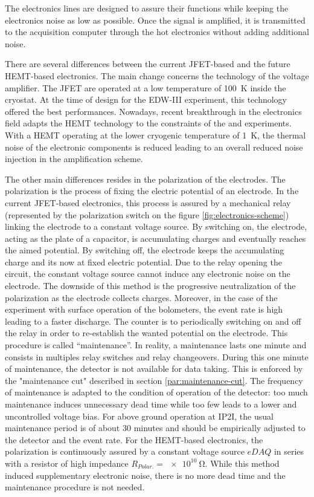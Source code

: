 The electronics lines are designed to assure their functions while keeping the electronics noise as low as possible. Once the signal is amplified, it is transmitted to the acquisition computer through the hot electronics without adding additional noise.

There are several differences between the current JFET-based and the future HEMT-based electronics.
The main change concerns the technology of the voltage amplifier. The JFET are operated at a low temperature of \SI{100}{\kelvin} inside the cryostat. At the time of design for the EDW-III experiment, this technology offered the best performances. Nowadays, recent breakthrough in the electronics field adapts the HEMT technology to the constraints of the \Edelweiss{} and \Ricochet{} experiments. With a HEMT operating at the lower cryogenic temperature of \SI{1}{\kelvin}, the thermal noise of the electronic components is reduced leading to an overall reduced noise injection in the amplification scheme.

The other main differences resides in the polarization of the electrodes. The polarization is the process of fixing the electric potential of an electrode.
In the current JFET-based electronics, this process is assured by a mechanical relay (represented by the polarization switch on the figure \ref{fig:electronics-scheme}) linking the electrode to a constant voltage source. By switching on, the electrode, acting as the plate of a capacitor, is accumulating charges and eventually reaches the aimed potential. By switching off, the electrode keeps the accumulating charge and its now at fixed electric potential. Due to the relay opening the circuit, the constant voltage source cannot induce any electronic noise on the electrode.
The downside of this method is the progressive neutralization of the polarization as the electrode collects charges. Moreover, in the case of the \Ricochet{} experiment with surface operation of the bolometers, the event rate is high leading to a faster discharge.
The counter is to periodically switching on and off the relay in order to re-establish the wanted potential on the electrode. This procedure is called “maintenance”. In reality, a maintenance lasts one minute and consists in multiples relay switches and relay changeovers. During this one minute of maintenance, the detector is not available for data taking. This is enforced by the "maintenance cut" described in section \ref{par:maintenance-cut}. The frequency of maintenance is adapted to the condition of operation of the detector: too much maintenance induces unnecessary dead time while too few leads to a lower and uncontrolled voltage bias. For above ground operation at IP2I, the usual maintenance period is of about 30 minutes and should be empirically adjusted to the detector and the event rate.
For the HEMT-based electronics, the polarization is continuously assured by a constant voltage source $eDAQ$ in series with a resistor of high impedance $R_{Polar.} = \SI{e10}{\ohm}$. While this method induced supplementary electronic noise, there is no more dead time and the maintenance procedure is not needed.

